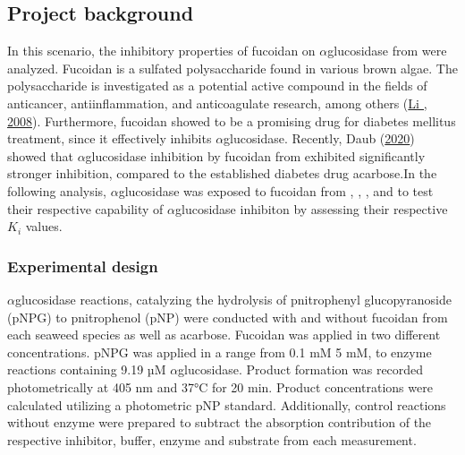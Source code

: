 \documentclass[letterpaper,12pt,english]{jupyterBook}
\begin{document}
\subsection{Project background}
\label{\detokenize{scenarios/glycosidase_inhibition:project-background}}
\sphinxAtStartPar
In this scenario, the inhibitory properties of fucoidan on \(\alpha\)\sphinxhyphen{}glucosidase from  were analyzed. Fucoidan is a sulfated polysaccharide found in various brown algae. The polysaccharide is investigated as a potential active compound in the fields of anti\sphinxhyphen{}cancer, anti\sphinxhyphen{}inflammation, and anti\sphinxhyphen{}coagulate research, among others (\hyperlink{cite.references:id7}{Li , 2008}). Furthermore, fucoidan showed to be a promising drug for diabetes mellitus treatment, since it effectively inhibits \(\alpha\)\sphinxhyphen{}glucosidase. Recently, Daub  (\hyperlink{cite.references:id6}{2020}) showed that \(\alpha\)\sphinxhyphen{}glucosidase inhibition by fucoidan from  exhibited significantly stronger inhibition, compared to the established diabetes drug acarbose.In the following analysis, \(\alpha\)\sphinxhyphen{}glucosidase was exposed to fucoidan from , , , and  to test their respective capability of \(\alpha\)\sphinxhyphen{}glucosidase inhibiton by assessing their respective \(K_{i}\) values.


\subsubsection{Experimental design}
\label{\detokenize{scenarios/glycosidase_inhibition:experimental-design}}
\sphinxAtStartPar
\(\alpha\)\sphinxhyphen{}glucosidase reactions, catalyzing the hydrolysis of p\sphinxhyphen{}nitrophenyl glucopyranoside (p\sphinxhyphen{}NPG) to p\sphinxhyphen{}nitrophenol (p\sphinxhyphen{}NP) were conducted with and without fucoidan from each seaweed species as well as acarbose. Fucoidan was applied in two different concentrations. p\sphinxhyphen{}NPG was applied in a range from 0.1 mM \sphinxhyphen{} 5 mM, to enzyme reactions containing 9.19 µM \(\alpha\)\sphinxhyphen{}glucosidase.
Product formation was recorded photometrically at 405 nm and 37°C for 20 min. Product concentrations were calculated utilizing a photometric p\sphinxhyphen{}NP standard. Additionally, control reactions without enzyme were prepared to subtract the absorption contribution of the respective inhibitor, buffer, enzyme and substrate from each measurement.
\end{document}
